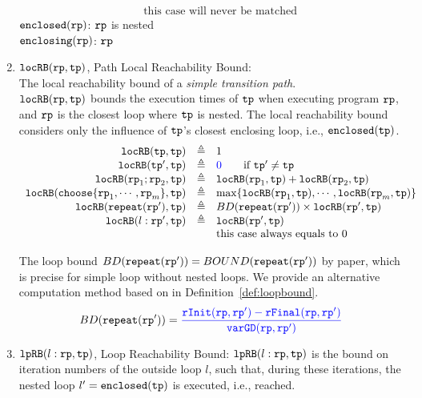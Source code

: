 \begin{enumerate}
\[\begin{array}{rcl}
        &  & \text{this case will never be matched}
        \end{array}
      \]
%
      $\mathtt{enclosed}(\mathtt{rp})$:  $\mathtt{rp}$ is nested
      \\
      $\mathtt{enclosing}(\mathtt{rp})$:  $\mathtt{rp}$
%
\item $\mathtt{locRB}(\mathtt{rp}, \mathtt{tp})$, Path Local Reachability Bound:
\\
The local reachability bound of a \emph{simple transition path}. 
\\
$\mathtt{locRB}(\mathtt{rp}, \mathtt{tp})$ bounds the execution times of $\mathtt{tp}$ when executing program $\mathtt{rp}$,
and $\mathtt{rp}$ is the closest loop where $\mathtt{tp}$ is nested.
The local reachability bound  considers only the influence of $\mathtt{tp}$'s closest enclosing loop, i.e., $\mathtt{enclosed}(\mathtt{tp})$.
%
\[
  \begin{array}{rcl}
    \outinB(\tpath, \tpath) & \triangleq & 1 \\
    \outinB(\tpath', \tpath) & \triangleq & \highlight{0} \qquad \text{if } \tpath' \neq \tpath\\
    \outinB(\rprog_1;\rprog_2, \tpath) & \triangleq & \outinB(\rprog_1, \tpath) + \outinB(\rprog_2, \tpath) \\
    \outinB(\rpchoose{\rprog_1, \cdots, \rprog_m }, \tpath) & \triangleq 
    & \max\left\{ \outinB(\rprog_1, \tpath), \cdots, \outinB(\rprog_m, \tpath) \right\} \\
    \outinB(\rprepeat(\rprog'), \tpath) & \triangleq 
    & BD(\rprepeat(\rprog'))
     \times \outinB(\rprog', \tpath)
     \\
    \outinB(l: \rprog', \tpath) & \triangleq & \outinB(\rprog', \tpath) \\
    &  & \text{this case always equals to } 0 \\
  \end{array}
  \]

  The loop bound $BD(\mathtt{repeat}(\mathtt{rp}')) = BOUND(\mathtt{repeat}(\mathtt{rp}'))$ by paper\cite{GulwaniJK09}, which is precise for simple loop without nested loops. 
  We provide an alternative computation method based on \cite{sinn2017complexity} in Definition~\ref{def:loopbound}.
  \[
    BD(\rprepeat(\rprog')) = \highlight{\frac{\rfinit(\rprog, \rprog') - \rffinal(\rprog, \rprog')}{\varGD(\rprog, \rprog')}}
\]
      \item $\mathtt{lpRB}(l: \mathtt{rp}, \mathtt{tp})$,
      {Loop Reachability Bound}:
        $\mathtt{lpRB}(l: \mathtt{rp}, \mathtt{tp})$
        is the bound on iteration numbers of the outside loop $l$,
        such that,
        during these iterations, the nested loop $l' = \mathtt{enclosed(\mathtt{tp})}$ is executed, i.e., reached.
        

\end{enumerate}

